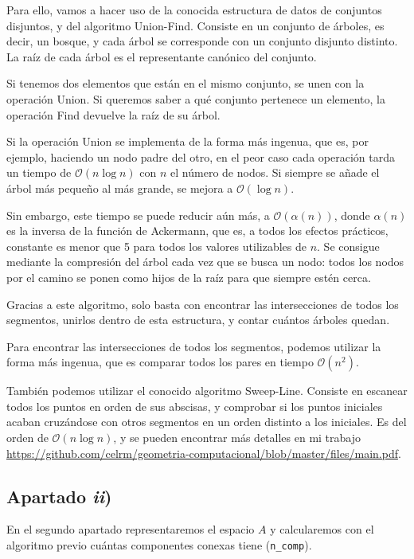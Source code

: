 \documentclass[a4paper]{article}
\begin{document}
	Para ello, vamos a hacer uso de la conocida estructura de datos de conjuntos disjuntos, y del algoritmo Union-Find. Consiste en un conjunto de árboles, es decir, un bosque, y cada árbol se corresponde con un conjunto disjunto distinto. La raíz de cada árbol es el representante canónico del conjunto. 
	
	Si tenemos dos elementos que están en el mismo conjunto, se unen con la operación Union. Si queremos saber a qué conjunto pertenece un elemento, la operación Find devuelve la raíz de su árbol.
	
	Si la operación Union se implementa de la forma más ingenua, que es, por ejemplo, haciendo un nodo padre del otro, en el peor caso cada operación tarda un tiempo de $\mathcal{O}(n\log n)$ con $n$ el número de nodos. Si siempre se añade el árbol más pequeño al más grande, se mejora a $\mathcal{O}(\log n)$. 
	
	Sin embargo, este tiempo se puede reducir aún más, a $\mathcal{O}(\alpha(n))$, donde $\alpha(n)$ es la inversa de la función de Ackermann, que es, a todos los efectos prácticos, constante \textemdash es menor que 5 para todos los valores utilizables de $n$. Se consigue mediante la compresión del árbol cada vez que se busca un nodo: todos los nodos por el camino se ponen como hijos de la raíz para que siempre estén cerca.
	
	Gracias a este algoritmo, solo basta con encontrar las intersecciones de todos los segmentos, unirlos dentro de esta estructura, y contar cuántos árboles quedan.
	
	Para encontrar las intersecciones de todos los segmentos, podemos utilizar la forma más ingenua, que es comparar todos los pares en tiempo $\mathcal{O}(n^2)$. 
	
	También podemos utilizar el conocido algoritmo Sweep-Line. Consiste en escanear todos los puntos en orden de sus abscisas, y comprobar si los puntos iniciales acaban cruzándose con otros segmentos en un orden distinto a los iniciales. Es del orden de $\mathcal{O}(n\log n)$, y se pueden encontrar más detalles en mi trabajo \url{https://github.com/celrm/geometria-computacional/blob/master/files/main.pdf}.
	
	\subsection{Apartado \textit{ii})}
	En el segundo apartado representaremos el espacio $A$ y calcularemos con el algoritmo previo cuántas componentes conexas tiene (\texttt{n\_comp}).
	
\end{document}
